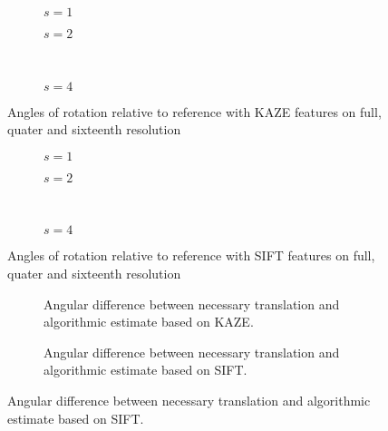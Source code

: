 \begin{figure}
   \begin{subfigure}{.5\linewidth}
      \centering      
      
      \label{fig:manor_KAZE_rotation_1}
      \caption{$s=1$}
   \end{subfigure}
   \quad
   \begin{subfigure}{.5\linewidth}
      \centering      
      
      \label{fig:manor_KAZE_rotation_2}
      \caption{$s=2$}
   \end{subfigure}\\[3ex]
   \begin{subfigure}{\linewidth}
      \centering      
      
      \label{fig:manor_KAZE_rotation_4}
      \caption{$s=4$}
   \end{subfigure}

   \caption{Angles of rotation relative to reference with
   KAZE features on full, quater and sixteenth resolution}
\end{figure}

\begin{figure}
   \begin{subfigure}{.5\linewidth}
      \centering      
      
      \label{fig:manor_SIFT_rotation_1}
      \caption{$s=1$}
   \end{subfigure}
   \quad
   \begin{subfigure}{.5\linewidth}
      \centering      
      
      \label{fig:manor_SIFT_rotation_2}
      \caption{$s=2$}
   \end{subfigure}\\[3ex]
   \begin{subfigure}{\linewidth}
      \centering      
      
      \label{fig:manor_SIFT_rotation_4}
      \caption{$s=4$}
   \end{subfigure}

   \caption{Angles of rotation relative to reference with
   SIFT features on full, quater and sixteenth resolution}
\end{figure}

\begin{figure}
   \begin{subfigure}{.5\linewidth}
      \centering      
      
      \caption{Angular difference between necessary translation and algorithmic
      estimate based on KAZE.}
      \label{fig:manor_KAZE_direction}
   \end{subfigure}
   \begin{subfigure}{.5\linewidth}
      \centering      
      
      \caption{Angular difference between necessary translation and algorithmic
      estimate based on SIFT.}
      \label{fig:manor_SIFT_direction}
   \end{subfigure}
   \label{fig:manor_direction}
\end{figure}
